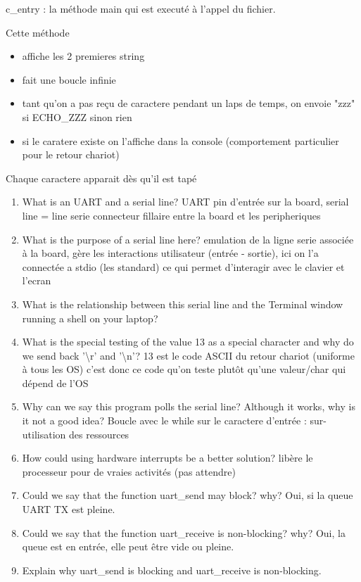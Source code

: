\documentclass[10]{article}
\begin{document}
c_entry : la méthode main qui est executé à l'appel du fichier. 

Cette méthode

\begin{itemize}
  \item affiche les 2 premieres string
  \item fait une boucle infinie
  \item tant qu'on a pas reçu de caractere pendant un laps de temps, on envoie "zzz" si ECHO_ZZZ sinon rien
  \item si le caratere existe on l'affiche dans la console (comportement particulier pour le retour chariot)
\end{itemize}

Chaque caractere apparait dès qu'il est tapé


\begin{enumerate}
\item
  What is an UART and a serial line? 
  UART pin d'entrée sur la board, serial line = line serie connecteur fillaire entre la board et les peripheriques
\item
  What is the purpose of a serial line here?
  emulation de la ligne serie associée à la board, gère les interactions utilisateur (entrée - sortie), ici on l'a connectée a stdio (les standard) ce qui permet d'interagir avec le clavier et l'ecran
\item
  What is the relationship between this serial line
  and the Terminal window running a shell on your laptop?
\item
  What is the special testing of the value 13 as a special
  character and why do we send back '\textbackslash r' and '\textbackslash n'?
  13 est le code ASCII du retour chariot (uniforme à tous les OS) c'est donc ce code qu'on teste plutôt qu'une valeur/char qui dépend de l'OS
\item
  Why can we say this program polls the serial line?
  Although it works, why is it not a good idea?
  Boucle avec le while sur le caractere d'entrée : sur-utilisation des ressources 
\item
  How could using hardware interrupts be a better solution?
  libère le processeur pour de vraies activités (pas attendre)
\item
  Could we say that the function uart\_send may block? why?
  Oui, si la queue UART TX est pleine.
\item
  Could we say that the function uart\_receive is non-blocking? why?
  Oui, la queue est en entrée, elle peut être vide ou pleine.
\item
  Explain why uart\_send is blocking and uart\_receive is non-blocking.  
\end{enumerate}
\end{document}
